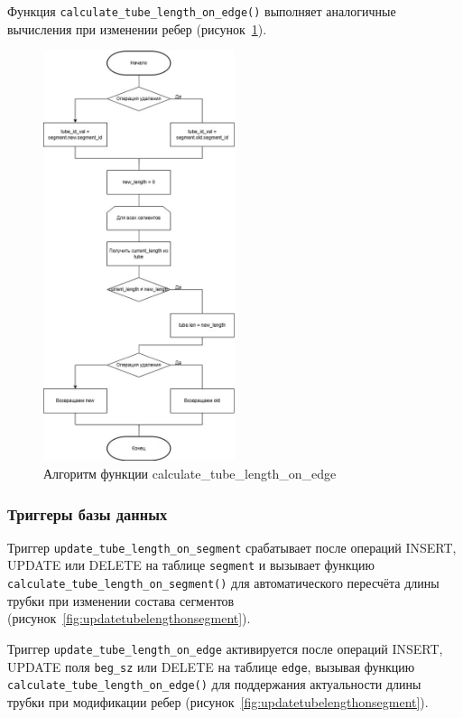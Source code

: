 Функция \texttt{calculate\_tube\_length\_on\_edge()} выполняет аналогичные вычисления при изменении ребер (рисунок~\ref{fig:calculatetubelengthonedge}). 

\begin{figure}[H]
\centering
\includegraphics[width=0.5\textwidth]{img/calculate_tube_length_on_edge.jpg}
\caption{Алгоритм функции calculate\_tube\_length\_on\_edge}
\label{fig:calculatetubelengthonedge}
\end{figure}

\subsubsection{Триггеры базы данных}

\noindent
\hspace{1.25cm}
Триггер \texttt{update\_tube\_length\_on\_segment} срабатывает после операций INSERT, UPDATE или DELETE на таблице \texttt{segment} и вызывает функцию \texttt{calculate\_tube\_length\_on\_segment()} для автоматического пересчёта длины трубки при изменении состава сегментов (рисунок~\ref{fig:updatetubelengthonsegment}).

\noindent
\hspace{1.25cm}
Триггер \texttt{update\_tube\_length\_on\_edge} активируется после операций INSERT, UPDATE поля \texttt{beg\_sz} или DELETE на таблице \texttt{edge}, вызывая функцию \texttt{calculate\_tube\_length\_on\_edge()} для поддержания актуальности длины трубки при модификации ребер (рисунок~\ref{fig:updatetubelengthonsegment}).

